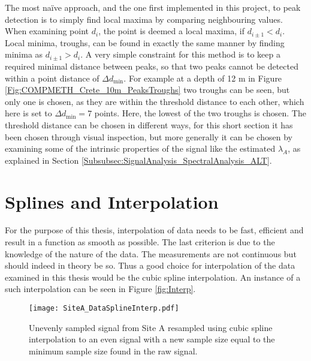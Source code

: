 \documentclass[../../CompleteThesis2/Complete_2ndDraft]{subfiles}
\begin{document}
The most naïve approach, and the one first implemented in this project, to peak detection is to simply find local maxima by comparing neighbouring values. When examining point $d_i$, the point is deemed a local maxima, if $d_{i\pm1} < d_i$. Local minima, troughs, can be found in exactly the same manner by finding minima as $d_{i\pm1} > d_i$. A very simple constraint for this method is to keep a required minimal distance between peaks, so that two peaks cannot be detected within a point distance of $\Delta d_{\text{min}}$. For example at a depth of 12 m in Figure \ref{Fig:COMPMETH_Crete_10m_PeaksTroughs} two troughs can be seen, but only one is chosen, as they are within the threshold distance to each other, which here is set to $\Delta d_{\text{min}} = 7$ points. Here, the lowest of the two troughs is chosen. The threshold distance can be chosen in different ways, for this short section it has been chosen through visual inspection, but more generally it can be chosen by examining some of the intrinsic properties of the signal like the estimated $\lambda_A$, as explained in Section \ref{Subsubsec:SignalAnalysis_SpectralAnalysis_ALT}.



\section[Splines and Interpolation]{Splines and Interpolation}	
\label{Sec:CompMeths_SplinesAndInterpolation}
For the purpose of this thesis, interpolation of data needs to be fast, efficient and result in a function as smooth as possible. The last criterion is due to the knowledge of the nature of the data. The measurements are not continuous but should indeed in theory be so. Thus a good choice for interpolation of the data examined in this thesis would be the cubic spline interpolation. An instance of a such interpolation can be seen in Figure \ref{fig:Interp}.

\begin{figure}[h]
	\centering
	\texttt{[image: SiteA\_DataSplineInterp.pdf]}
	\caption[Even resampling of unevenly sampled data, Site A.]{\small Unevenly sampled signal from Site A resampled using cubic spline interpolation to an even signal with a new sample size equal to the minimum sample size found in the raw signal.}
	\label{Fig:COMPMETH_SiteA_DataSplineInterp}
\end{figure}
\end{document}
